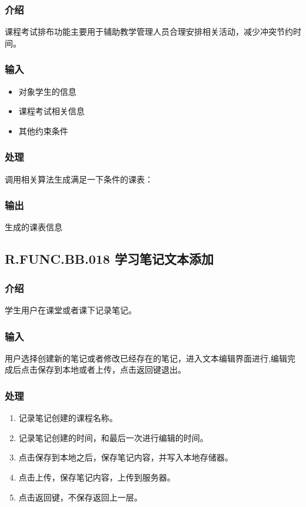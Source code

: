     \subsubsection{介绍}
    课程考试排布功能主要用于辅助教学管理人员合理安排相关活动，减少冲突节约时间。
    \subsubsection{输入}
    \begin{itemize}
      \item 对象学生的信息
      \item 课程考试相关信息
      \item 其他约束条件
    \end{itemize}
    \subsubsection{处理}
    调用相关算法生成满足一下条件的课表：
    \subsubsection{输出}
    生成的课表信息

 \subsection{R.FUNC.BB.018 学习笔记文本添加}
    \subsubsection{介绍}
    学生用户在课堂或者课下记录笔记。
    \subsubsection{输入}
    用户选择创建新的笔记或者修改已经存在的笔记，进入文本编辑界面进行,编辑完成后点击保存到本地或者上传，点击返回键退出。
    \subsubsection{处理}
    \begin{enumerate}
      \item 记录笔记创建的课程名称。
      \item 记录笔记创建的时间，和最后一次进行编辑的时间。
      \item 点击保存到本地之后，保存笔记内容，并写入本地存储器。
      \item 点击上传，保存笔记内容，上传到服务器。
      \item 点击返回键，不保存返回上一层。
    \end{enumerate}
